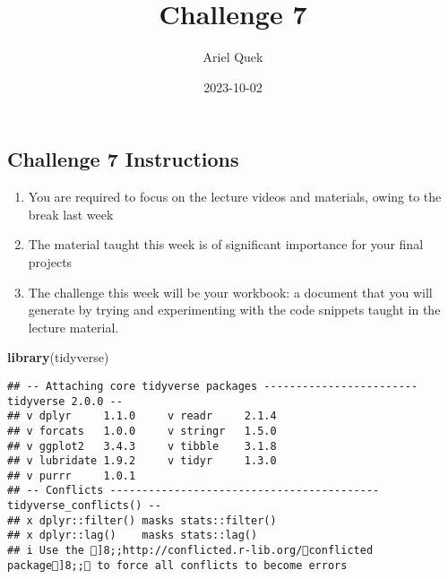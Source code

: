 \documentclass[
]{article}
\title{Challenge 7}
\author{Ariel Quek}
\date{2023-10-02}
\newenvironment{Shaded}{\begin{snugshade}}{\end{snugshade}}
\newcommand{\AttributeTok}[1]{\textcolor[rgb]{0.13,0.29,0.53}{#1}}
\newcommand{\ConstantTok}[1]{\textcolor[rgb]{0.56,0.35,0.01}{#1}}
\newcommand{\FunctionTok}[1]{\textcolor[rgb]{0.13,0.29,0.53}{\textbf{#1}}}
\newcommand{\NormalTok}[1]{#1}
\newcommand{\SpecialCharTok}[1]{\textcolor[rgb]{0.81,0.36,0.00}{\textbf{#1}}}
\begin{document}
\maketitle

\begin{Shaded}
\end{Shaded}

\hypertarget{challenge-7-instructions}{%
\subsection{Challenge 7 Instructions}\label{challenge-7-instructions}}

\begin{enumerate}
\def\labelenumi{\arabic{enumi}.}
\item
  You are required to focus on the lecture videos and materials, owing
  to the break last week
\item
  The material taught this week is of significant importance for your
  final projects
\item
  The challenge this week will be your workbook: a document that you
  will generate by trying and experimenting with the code snippets
  taught in the lecture material.
\end{enumerate}

\begin{Shaded}
\begin{Highlighting}[]
\FunctionTok{library}\NormalTok{(tidyverse)}
\end{Highlighting}
\end{Shaded}

\begin{verbatim}
## -- Attaching core tidyverse packages ------------------------ tidyverse 2.0.0 --
## v dplyr     1.1.0     v readr     2.1.4
## v forcats   1.0.0     v stringr   1.5.0
## v ggplot2   3.4.3     v tibble    3.1.8
## v lubridate 1.9.2     v tidyr     1.3.0
## v purrr     1.0.1     
## -- Conflicts ------------------------------------------ tidyverse_conflicts() --
## x dplyr::filter() masks stats::filter()
## x dplyr::lag()    masks stats::lag()
## i Use the ]8;;http://conflicted.r-lib.org/conflicted package]8;; to force all conflicts to become errors
\end{verbatim}
\end{document}
